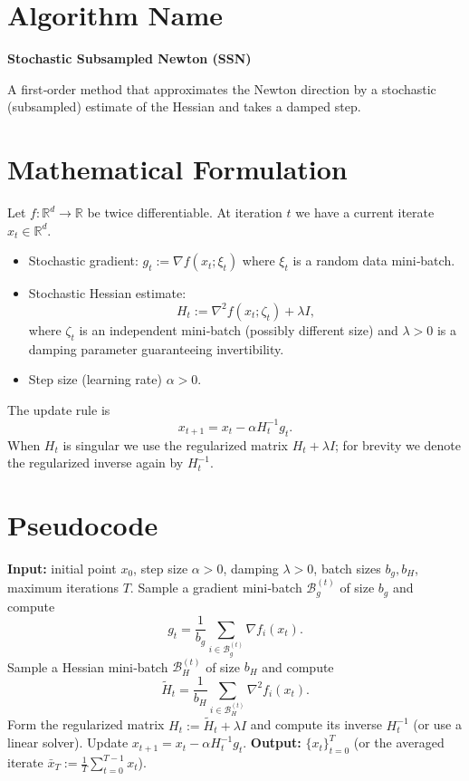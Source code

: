 \documentclass{article}
\newcommand{\R}{\mathbb{R}}
\begin{document}
\section*{Algorithm Name}
\textbf{Stochastic Subsampled Newton (SSN)}  

A first‑order method that approximates the Newton direction by a stochastic (subsampled) estimate of the Hessian and takes a damped step.

\section*{Mathematical Formulation}
Let $f:\R^{d}\rightarrow\R$ be twice differentiable. At iteration $t$ we have a current iterate $x_t\in\R^{d}$.  
\begin{itemize}
    \item Stochastic gradient: $g_t:=\nabla f(x_t;\xi_t)$ where $\xi_t$ is a random data mini‑batch.
    \item Stochastic Hessian estimate: 
    \[
        H_t:=\nabla^{2} f(x_t;\zeta_t)+\lambda I,
    \]
    where $\zeta_t$ is an independent mini‑batch (possibly different size) and $\lambda>0$ is a damping parameter guaranteeing invertibility.
    \item Step size (learning rate) $\alpha>0$.
\end{itemize}
The update rule is
\begin{equation}
    x_{t+1}=x_t-\alpha H_t^{-1}g_t . \tag{1}
\end{equation}
When $H_t$ is singular we use the regularized matrix $H_t+\lambda I$; for brevity we denote the regularized inverse again by $H_t^{-1}$.

\section*{Pseudocode}
\begin{algorithm}[H]
\caption{Stochastic Subsampled Newton (SSN)}
\begin{algorithmic}[1]
\State \textbf{Input:} initial point $x_0$, step size $\alpha>0$, damping $\lambda>0$, batch sizes $b_g,b_H$, maximum iterations $T$.
    \State Sample a gradient mini‑batch $\mathcal{B}_g^{(t)}$ of size $b_g$ and compute 
    \[
        g_t=\frac{1}{b_g}\sum_{i\in\mathcal{B}_g^{(t)}} \nabla f_i(x_t).
    \]
    \State Sample a Hessian mini‑batch $\mathcal{B}_H^{(t)}$ of size $b_H$ and compute 
    \[
        \tilde H_t=\frac{1}{b_H}\sum_{i\in\mathcal{B}_H^{(t)}} \nabla^{2} f_i(x_t).
    \]
    \State Form the regularized matrix $H_t:=\tilde H_t+\lambda I$ and compute its inverse $H_t^{-1}$ (or use a linear solver).
    \State Update $x_{t+1}=x_t-\alpha H_t^{-1}g_t$.
\EndFor
\State \textbf{Output:} $\{x_t\}_{t=0}^{T}$ (or the averaged iterate $\bar x_T:=\frac1T\sum_{t=0}^{T-1}x_t$).
\end{algorithmic}
\end{algorithm}
\end{document}
